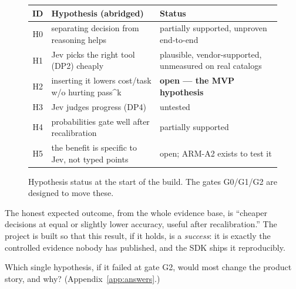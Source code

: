 \begin{figure}[h]\centering
\small
\begin{tabular}{@{}clp{6.2cm}@{}}
\toprule
ID & Hypothesis (abridged) & Status \\
\midrule
H0 & separating decision from reasoning helps & partially supported, unproven end-to-end \\
H1 & Jev picks the right tool (DP2) cheaply & plausible, vendor-supported, unmeasured on real catalogs \\
H2 & inserting it lowers cost/task w/o hurting pass\^{}k & \textbf{open --- the MVP hypothesis} \\
H3 & Jev judges progress (DP4) & untested \\
H4 & probabilities gate well after recalibration & partially supported \\
H5 & the benefit is specific to Jev, not typed points & open; ARM-A2 exists to test it \\
\bottomrule
\end{tabular}
\caption{Hypothesis status at the start of the build. The gates G0/G1/G2 are designed to move
these.}
\label{fig:hypotheses}
\end{figure}

\begin{whyhere}
The honest expected outcome, from the whole evidence base, is ``cheaper decisions at equal or
slightly lower accuracy, useful after recalibration.'' The project is built so that this
result, if it holds, is a \emph{success}: it is exactly the controlled evidence nobody has
published, and the SDK ships it reproducibly.
\end{whyhere}

\begin{checkbox}
Which single hypothesis, if it failed at gate G2, would most change the product story, and why?
(Appendix~\ref{app:answers}.)
\end{checkbox}
